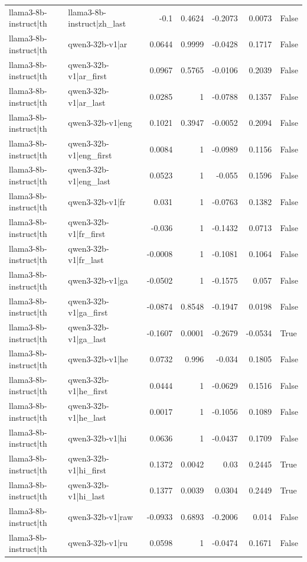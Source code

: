 \begin{table}
\begin{tabular}{l l r r r r l}
llama3-8b-instruct|th & llama3-8b-instruct|zh_last & -0.1 & 0.4624 & -0.2073 & 0.0073 & False \\
llama3-8b-instruct|th & qwen3-32b-v1|ar & 0.0644 & 0.9999 & -0.0428 & 0.1717 & False \\
llama3-8b-instruct|th & qwen3-32b-v1|ar_first & 0.0967 & 0.5765 & -0.0106 & 0.2039 & False \\
llama3-8b-instruct|th & qwen3-32b-v1|ar_last & 0.0285 & 1 & -0.0788 & 0.1357 & False \\
llama3-8b-instruct|th & qwen3-32b-v1|eng & 0.1021 & 0.3947 & -0.0052 & 0.2094 & False \\
llama3-8b-instruct|th & qwen3-32b-v1|eng_first & 0.0084 & 1 & -0.0989 & 0.1156 & False \\
llama3-8b-instruct|th & qwen3-32b-v1|eng_last & 0.0523 & 1 & -0.055 & 0.1596 & False \\
llama3-8b-instruct|th & qwen3-32b-v1|fr & 0.031 & 1 & -0.0763 & 0.1382 & False \\
llama3-8b-instruct|th & qwen3-32b-v1|fr_first & -0.036 & 1 & -0.1432 & 0.0713 & False \\
llama3-8b-instruct|th & qwen3-32b-v1|fr_last & -0.0008 & 1 & -0.1081 & 0.1064 & False \\
llama3-8b-instruct|th & qwen3-32b-v1|ga & -0.0502 & 1 & -0.1575 & 0.057 & False \\
llama3-8b-instruct|th & qwen3-32b-v1|ga_first & -0.0874 & 0.8548 & -0.1947 & 0.0198 & False \\
llama3-8b-instruct|th & qwen3-32b-v1|ga_last & -0.1607 & 0.0001 & -0.2679 & -0.0534 & True \\
llama3-8b-instruct|th & qwen3-32b-v1|he & 0.0732 & 0.996 & -0.034 & 0.1805 & False \\
llama3-8b-instruct|th & qwen3-32b-v1|he_first & 0.0444 & 1 & -0.0629 & 0.1516 & False \\
llama3-8b-instruct|th & qwen3-32b-v1|he_last & 0.0017 & 1 & -0.1056 & 0.1089 & False \\
llama3-8b-instruct|th & qwen3-32b-v1|hi & 0.0636 & 1 & -0.0437 & 0.1709 & False \\
llama3-8b-instruct|th & qwen3-32b-v1|hi_first & 0.1372 & 0.0042 & 0.03 & 0.2445 & True \\
llama3-8b-instruct|th & qwen3-32b-v1|hi_last & 0.1377 & 0.0039 & 0.0304 & 0.2449 & True \\
llama3-8b-instruct|th & qwen3-32b-v1|raw & -0.0933 & 0.6893 & -0.2006 & 0.014 & False \\
llama3-8b-instruct|th & qwen3-32b-v1|ru & 0.0598 & 1 & -0.0474 & 0.1671 & False \\

\end{tabular}
\end{table}
